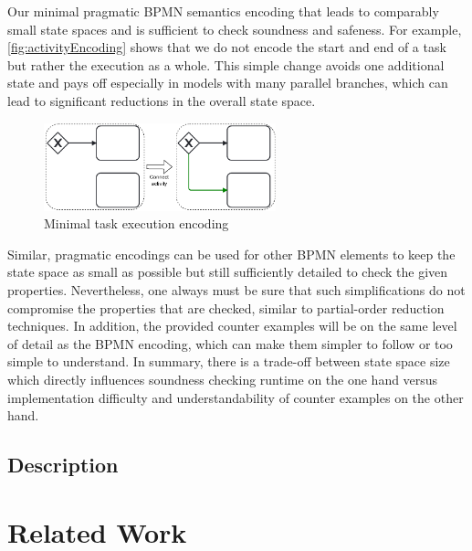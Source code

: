\documentclass[runningheads]{llncs}
\begin{document}
Our minimal pragmatic BPMN semantics encoding that leads to comparably small state spaces and is sufficient to check soundness and safeness.
For example, \autoref{fig:activityEncoding} shows that we do not encode the start and end of a task but rather the execution as a whole.
This simple change avoids one additional state and pays off especially in models with many parallel branches, which can lead to significant reductions in the overall state space.

\begin{figure}[ht]
	\centering
	\includegraphics[width=0.6\textwidth]{images/dead}
	\caption{Minimal task execution encoding}
	\label{fig:activityEncoding}
\end{figure}

Similar, pragmatic encodings can be used for other BPMN elements to keep the state space as small as possible but still sufficiently detailed to check the given properties.
Nevertheless, one always must be sure that such simplifications do not compromise the properties that are checked, similar to partial-order reduction techniques.
In addition, the provided counter examples will be on the same level of detail as the BPMN encoding, which can make them simpler to follow or too simple to understand.
In summary, there is a trade-off between state space size which directly influences soundness checking runtime on the one hand versus implementation difficulty and understandability of counter examples on the other hand.

\subsection{Description}
\cite{camundaservicesgmbhBpmnjs2024}

\section{Related Work}
\end{document}

